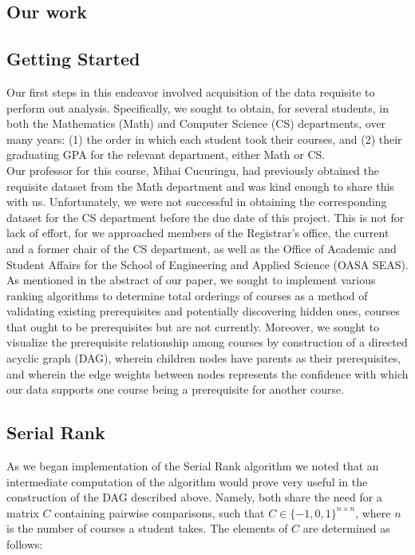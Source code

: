 \documentclass[10pt]{siamltex}
\begin{document}
\begin{pagewiselinenumbers}
\section{Our work}    \label{sec:ourWork}
\subsection{Getting Started}
Our first steps in this endeavor involved acquisition of the data requisite to perform out analysis. Specifically, we sought to obtain, for several students, in both the Mathematics (Math) and Computer Science (CS) departments, over many years: (1) the order in which each student took their courses, and (2) their graduating GPA for the relevant department, either Math or CS.\\

Our professor for this course, Mihai Cucuringu, had previously obtained the requisite dataset from the Math department and was kind enough to share this with us. Unfortunately, we were not successful in obtaining the corresponding dataset for the CS department before the due date of this project. This is not for lack of effort, for we approached members of the Registrar's office, the current and a former chair of the CS department, as well as the Office of Academic and Student Affairs for the School of Engineering and Applied Science (OASA SEAS).\\

As mentioned in the abstract of our paper, we sought to implement various ranking algorithms to determine total orderings of courses as a method of validating existing prerequisites and potentially discovering hidden ones, courses that ought to be prerequisites but are not currently. Moreover, we sought to visualize the prerequisite relationship among courses by construction of a directed acyclic graph (DAG), wherein children nodes have parents as their prerequisites, and wherein the edge weights between nodes represents the confidence with which our data supports one course being a prerequisite for another course. \\

\subsection{Serial Rank}
As we began implementation of the Serial Rank algorithm we noted that an intermediate computation of the algorithm would prove very useful in the construction of the DAG described above. Namely, both share the need for a matrix $C$ containing pairwise comparisons, such that $C\in \{-1,0,1\}^{n\times n}$, where $n$ is the number of courses a student takes. The elements of $C$ are determined as follows:


\end{pagewiselinenumbers}
\end{document}
